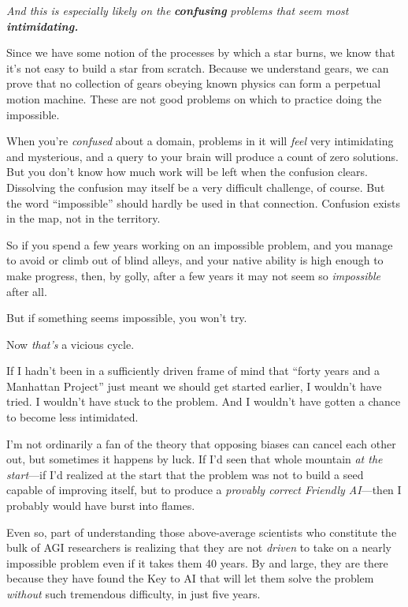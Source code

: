 {
 \textit{And this is especially likely on the
}\textbf{\textit{confusing}} \textit{problems that seem most}
\textbf{\textit{intimidating.}}}

{
 Since we have some notion of the processes by which a star burns,
we know that it's not easy to build a star from
scratch. Because we understand gears, we can prove that no collection
of gears obeying known physics can form a perpetual motion machine.
These are not good problems on which to practice doing the impossible.}

{
 When you're \textit{confused} about a domain,
problems in it will \textit{feel} very intimidating and mysterious, and
a query to your brain will produce a count of zero solutions. But you
don't know how much work will be left when the
confusion clears. Dissolving the confusion may itself be a very
difficult challenge, of course. But the word
``impossible'' should hardly be used
in that connection. Confusion exists in the map, not in the territory.}

{
 So if you spend a few years working on an impossible problem, and
you manage to avoid or climb out of blind alleys, and your native
ability is high enough to make progress, then, by golly, after a few
years it may not seem so \textit{impossible} after all.}

{
 But if something seems impossible, you won't try.}

{
 Now \textit{that's} a vicious cycle.}

{
 If I hadn't been in a sufficiently driven frame of
mind that ``forty years and a Manhattan
Project'' just meant we should get started earlier, I
wouldn't have tried. I wouldn't have
stuck to the problem. And I wouldn't have gotten a
chance to become less intimidated.}

{
 I'm not ordinarily a fan of the theory that
opposing biases can cancel each other out, but sometimes it happens by
luck. If I'd seen that whole mountain \textit{at the
start}{}---if I'd realized at the start that the
problem was not to build a seed capable of improving itself, but to
produce a \textit{provably correct Friendly AI}{}---then I probably
would have burst into flames.}

{
 Even so, part of understanding those above-average scientists who
constitute the bulk of AGI researchers is realizing that they are not
\textit{driven} to take on a nearly impossible problem even if it takes
them 40 years. By and large, they are there because they have found the
Key to AI that will let them solve the problem \textit{without} such
tremendous difficulty, in just five years.}

